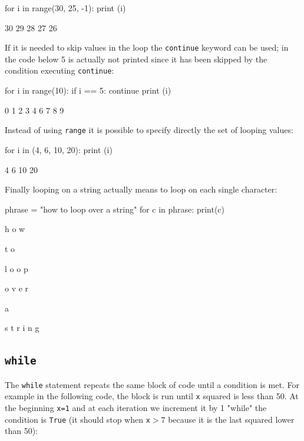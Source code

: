 \begin{ipython}
for i in range(30, 25, -1):
    print (i)	
\end{ipython}
\begin{ioutput}
30
29
28
27
26	
\end{ioutput}

If it is needed to skip values in the loop the \texttt{continue} keyword can be used; in the code below 5 is actually not printed since it has been skipped by the condition executing \texttt{continue}:

\begin{ipython}
for i in range(10):
    if i == 5:
        continue
    print (i)	
\end{ipython}
\begin{ioutput}
0
1
2
3
4
6
7
8
9	
\end{ioutput}

Instead of using \texttt{range} it is possible to specify directly the set of looping values:

\begin{ipython}
for i in (4, 6, 10, 20):
    print (i)	
\end{ipython}
\begin{ioutput}
4
6
10
20	
\end{ioutput}

Finally looping on a string actually means to loop on each single character:
 
\begin{ipython}
phrase = "how to loop over a string"
for c in phrase:
    print(c) 	
\end{ipython}
\begin{ioutput}
h
o
w

t
o

l
o
o
p

o
v
e
r

a

s
t
r
i
n
g
\end{ioutput}
 
\subsection{\texttt{while}}\label{while}

The \texttt{while} statement repeats the same block of code until a condition is met. For example in the following code, the block is run until \texttt{x} squared is less than 50. At the beginning \texttt{x=1} and at each iteration we increment it by 1 "while" the condition is \texttt{True} (it should stop when \texttt{x}$> 7$ because it is the last squared lower than 50):

